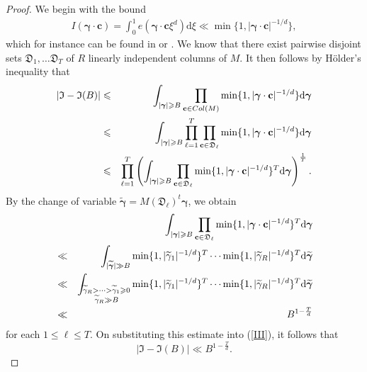 \documentclass[reqno, 12pt, reqno]{amsart}
\numberwithin{equation}{section}
\renewcommand{\leq}{\leqslant}
\renewcommand{\geq}{\geqslant}
\renewcommand{\c}{\mathbf{c}}
\newcommand{\bgamma}{\boldsymbol{\gamma}}
\renewcommand{\=}{\equiv}
\begin{document}
\begin{proof}
We begin with the bound
\begin{eqnarray}
\label{bdd}
I(\bgamma \cdot \c) = \int_0^1 e(\bgamma \cdot \c \xi^d )\mathrm{d} \xi
\ll
\min \{ 1, \vert \bgamma \cdot \c \vert^{-1/d} \},
\end{eqnarray}
which for instance can be found in \cite[p. 21]{Davenport} or \cite[Lemma 2.8]{Vaughan}.
We know that there exist pairwise disjoint sets $\mathfrak D_1, \ldots \mathfrak D_T$ of $R$ linearly independent columns of $M$.
It then follows by  H{\"o}lder's inequality that
\begin{eqnarray}
\label{III}
|\mathfrak{I}  - \mathfrak{I}  (B) | &\leq &
\int_{\vert \bgamma \vert \geq B} \prod_{\c \in \textnormal{Col}(M)} \min \{ 1,  \vert \bgamma \cdot \c \vert^{-1/d}\} \mathrm{d}\bgamma
\\
\notag
&\leq&
\int_{\vert \bgamma \vert \geq B}  \prod_{\ell = 1}^{ T }  \prod_{\c \in \mathfrak{D}_\ell}  \min \{ 1,  \vert \bgamma \cdot  \c \vert^{-1/d}\} \mathrm{d}\bgamma
\\
\notag
&\leq&
\prod_{\ell = 1}^{ T } \left(  \int_{\vert \bgamma \vert \geq B} \prod_{\c \in \mathfrak{D}_\ell}  \min \{ 1,  \vert \bgamma \cdot  \c \vert^{-1/d}\}^{ T } \mathrm{d}\bgamma \right)^{ \frac{1}{T} }.
\end{eqnarray}
By the change of variable $\widetilde{\bgamma} = M(\mathfrak{D}_\ell)^t \bgamma $, we obtain
\begin{eqnarray}
&&\int_{\vert \bgamma \vert \geq B} \prod_{\c \in \mathfrak{D}_\ell}  \min \{ 1,  \vert \bgamma \cdot  \c \vert^{-1/d}\}^{ T } \mathrm{d}\bgamma
\notag
\\
&\ll&
\notag
\int_{\vert \widetilde{\bgamma} \vert \gg B} \min \{ 1,  \vert \widetilde{\gamma}_1 \vert^{-1/d}\}^{ T } \cdots  \min \{ 1,  \vert \widetilde{\gamma}_R \vert^{-1/d}\}^{ T }   \mathrm{d} \widetilde{ \bgamma }
\\
\notag
&\ll&
\int_{ \substack{ \widetilde{\gamma}_R > \cdots >  \widetilde{\gamma}_1 \geq 0 \\ \widetilde{\gamma}_R \gg B } }
\min \{ 1,  \vert \widetilde{\gamma}_1 \vert^{-1/d}\}^{ T } \cdots  \min \{ 1,  \vert \widetilde{\gamma}_R \vert^{-1/d}\}^{ T }   \mathrm{d} \widetilde{ \bgamma }
\\
\notag
&\ll& B^{1 - \frac{ T }{d}}
\end{eqnarray}
for each $1 \leq \ell \leq T$. On substituting this estimate into (\ref{III}), it follows that
$$
|\mathfrak{I}  - \mathfrak{I} (B) | \ll B^{1 - \frac{ T }{d}}.
$$

\end{proof}
\end{document}
